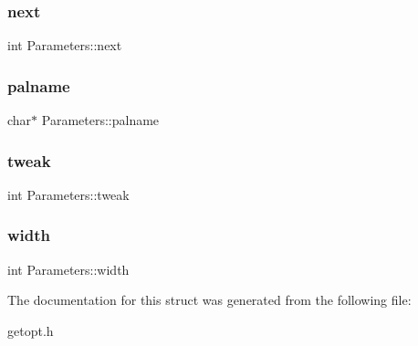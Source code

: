 \subsubsection{\texorpdfstring{next}{next}}
{\footnotesize\ttfamily int Parameters\+::next}

\mbox{\label{struct_parameters_af435d3291ff1a66552d9f3383c6a517c}} 
\subsubsection{\texorpdfstring{palname}{palname}}
{\footnotesize\ttfamily char$\ast$ Parameters\+::palname}

\mbox{\label{struct_parameters_a1962cf70d9f60c9b1b6d567a0152776b}} 
\subsubsection{\texorpdfstring{tweak}{tweak}}
{\footnotesize\ttfamily int Parameters\+::tweak}

\mbox{\label{struct_parameters_ae8f341732b04b09c84f67f0439efb79d}} 
\subsubsection{\texorpdfstring{width}{width}}
{\footnotesize\ttfamily int Parameters\+::width}



The documentation for this struct was generated from the following file\+:\begin{DoxyCompactItemize}
\item 
getopt.\+h\end{DoxyCompactItemize}
